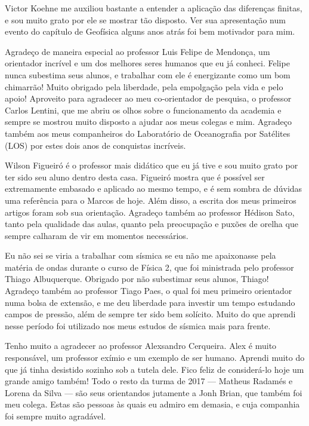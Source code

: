   Victor Koehne me auxiliou bastante a entender a aplicação das diferenças finitas, e sou muito grato por ele se mostrar tão disposto. Ver sua apresentação num evento do capítulo de Geofísica alguns anos atrás foi bem motivador para mim.

  Agradeço de maneira especial ao professor Luis Felipe de Mendonça, um orientador incrível e um dos melhores seres humanos que eu já conheci. Felipe nunca subestima seus alunos, e trabalhar com ele é energizante como um bom chimarrão! Muito obrigado pela liberdade, pela empolgação pela vida e pelo apoio! Aproveito para agradecer ao meu co-orientador de pesquisa, o professor Carlos Lentini, que me abriu os olhos sobre o funcionamento da academia e sempre se mostrou muito disposto a ajudar aos meus colegas e mim. Agradeço também aos meus companheiros do Laboratório de Oceanografia por Satélites (LOS) por estes dois anos de conquistas incríveis.

  Wilson Figueiró é o professor mais didático que eu já tive e sou muito grato por ter sido seu aluno dentro desta casa. Figueiró mostra que é possível ser extremamente embasado e aplicado ao mesmo tempo, e é sem sombra de dúvidas uma referência para o Marcos de hoje. Além disso, a escrita dos meus primeiros artigos foram sob sua orientação. Agradeço também ao professor Hédison Sato, tanto pela qualidade das aulas, quanto pela preocupação e puxões de orelha que sempre calharam de vir em momentos necessários.

  Eu não sei se viria a trabalhar com sísmica se eu não me apaixonasse pela matéria de ondas durante o curso de Física 2, que foi ministrada pelo professor Thiago Albuquerque. Obrigado por não subestimar seus alunos, Thiago! Agradeço também ao professor Tiago Paes, o qual foi meu primeiro orientador numa bolsa de extensão, e me deu liberdade para investir um tempo estudando campos de pressão, além de sempre ter sido bem solícito. Muito do que aprendi nesse período foi utilizado nos meus estudos de sísmica mais para frente.

  Tenho muito a agradecer ao professor Alexsandro Cerqueira. Alex é muito responsável, um professor exímio e um exemplo de ser humano. Aprendi muito do que já tinha desistido sozinho sob a tutela dele. Fico feliz de considerá-lo hoje um grande amigo também! Todo o resto da turma de 2017 --- Matheus Radamés e Lorena da Silva --- são seus orientandos jutamente a Jonh Brian, que também foi meu colega. Estas são pessoas às quais eu admiro em demasia, e cuja companhia foi sempre muito agradável.

